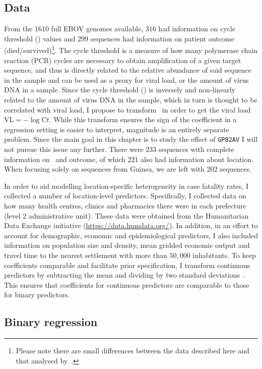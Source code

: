 \subsection{Data}

From the 1610 full EBOV genomes available, $316$ had information on cycle threshold (\ct) values and $299$ sequences had information on patient outcome (died/survived)\footnote{Please note there are small differences between the data described here and that analysed by~\cite{Diehl2016}.}.
The cycle threshold is a measure of how many polymerase chain reaction (PCR) cycles are necessary to obtain amplification of a given target sequence, and thus is directly related to the relative abundance of said sequence in the sample and can be used as a proxy for viral load, or the amount of virus DNA in a sample.
Since the cycle threshold (\ct) is inversely and non-linearly related to the amount of virus DNA in the sample, which in turn is thought to be correlated with viral load, I propose to transform \ct~in order to get the viral load $\text{VL} = -\log \text{C}t$.
While this transform ensures the sign of the coefficient in a regression setting is easier to interpret, magnitude is an entirely separate problem.
Since the main goal in this chapter is to study the effect of \verb|GP82AV| I will not pursue this issue any further.
There were $233$ sequences with complete information on \ct~and outcome, of which $221$ also had information about location.
When focusing solely on sequences from Guinea, we are left with $202$ sequences.

In order to aid modelling location-specific heterogeneity in case fatality rates, I collected a number of location-level predictors.
Specifically, I collected data on how many health centres, clinics and pharmacies there were in each prefecture (level 2 administrative unit).
These data were obtained from the Humanitarian Data Exchange initiative (\url{https://data.humdata.org/}).
In addition, in an effort to account for demographic, economic and epidemiological predictors, I also included information on population size and density, mean gridded economic output and travel time to the nearest settlement with more than $50,000$ inhabitants.
To keep coefficients comparable and facilitate prior specification, I transform continuous predictors by subtracting the mean and dividing by two standard deviations~\citep{Gelman2008}.
This ensures that coefficients for continuous predictors are comparable to those for binary predictors.

\subsection{Binary regression}
\label{sec:binreg}


